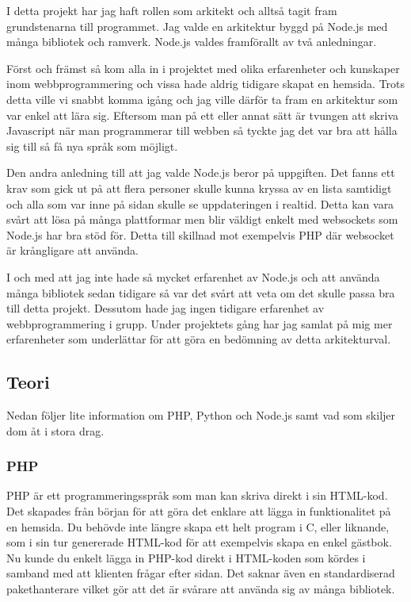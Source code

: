 I detta projekt har jag haft rollen som arkitekt och alltså tagit fram grundstenarna till programmet. Jag valde en arkitektur byggd på Node.js med många bibliotek och ramverk. Node.js valdes framförallt av två anledningar. 

Först och främst så kom alla in i projektet med olika erfarenheter och kunskaper inom webbprogrammering och vissa hade aldrig tidigare skapat en hemsida. Trots detta ville vi snabbt komma igång och jag ville därför ta fram en arkitektur som var enkel att lära sig. Eftersom man på ett eller annat sätt är tvungen att skriva Javascript när man programmerar till webben så tyckte jag det var bra att hålla sig till så få nya språk som möjligt.

Den andra anledning till att jag valde Node.js beror på uppgiften. Det fanns ett krav som gick ut på att flera personer skulle kunna kryssa av en lista samtidigt och alla som var inne på sidan skulle se uppdateringen i realtid. Detta kan vara svårt att lösa på många plattformar men blir väldigt enkelt med websockets som Node.js har bra stöd för. Detta till skillnad mot exempelvis PHP där websocket är krångligare att använda.

I och med att jag inte hade så mycket erfarenhet av Node.js och att använda många bibliotek sedan tidigare så var det svårt att veta om det skulle passa bra till detta projekt. Dessutom hade jag ingen tidigare erfarenhet av webbprogrammering i grupp. Under projektets gång har jag samlat på mig mer erfarenheter som underlättar för att göra en bedömning av detta arkitekturval.

\subsection{Teori}

Nedan följer lite information om PHP, Python och Node.js samt vad som skiljer dom åt i stora drag.

\subsubsection{PHP}

PHP är ett programmeringsspråk som man kan skriva direkt i sin HTML-kod. Det skapades från början för att göra det enklare att lägga in funktionalitet på en hemsida. Du behövde inte längre skapa ett helt program i C, eller liknande, som i sin tur genererade HTML-kod för att exempelvis skapa en enkel gästbok\cite{php_history}. Nu kunde du enkelt lägga in PHP-kod direkt i HTML-koden som kördes i samband med att klienten frågar efter sidan. Det saknar även en standardiserad pakethanterare vilket gör att det är svårare att använda sig av många bibliotek. 

